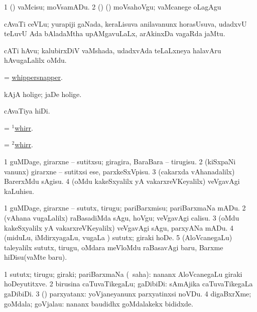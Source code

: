 \noindent
\gl{\akirx}
\expl{}
\bmng
\bnum
\num{1} (\AmA) vaMcisu; moVsamADu. 
\num{2} (\ame) (\ashi) moVsahoVgu; vaMcanege oLagAgu 
\enum
\emng
\eentry

\bentry 
{} 
\gl{\nA}
\expl{}
\bmng
cAvaTi ceVLu; yurapiji gaNada, keraLisuva anilavanunx horasUsuva, udadxvU teLuvU Ada bAladaMtha upAMgavuLaLx, arAkinxDa vagaRda jaMtu. 
\emng
\eentry

\bentry
{} 
\gl{\nA}
\expl{}
\bmng
cATi hAvu; kalubirxDiV vaMshada, udadxvAda teLaLxneya halavAru hAvugaLalilx oMdu. 
\emng
\eentry

\bentry
{} 
\gl{\nA}
\expl{}
\bmng
= \hyperlink{whippersnapper}{whippersnapper}. 
\emng
\eentry

\bentry
{} 
\gl{\nA}
\expl{}
\bmng
kAjA holige; jaDe holige. 
\emng
\eentry

\bentry
{} 
\gl{\nA}
\expl{}
\bmng
cAvaTiya hiDi. 
\emng
\eentry

\bentry
{} 
\gl{\akirx}
\expl{}
\bmng
= \hyperlink{whirr(1)}{$^1$whirr}. 
\emng
\eentry

\bentry
{} 
\gl{\nA}
\expl{}
\bmng
= \hyperlink{whirr(2)}{$^2$whirr}. 
\emng
\eentry

\bentry
{} 
\gl{\sakirx}
\expl{}
\bmng
\bnum
\num{1} guMDage, girarxne -- sutitxsu; giragira, BaraBara -- tirugisu. 
\num{2} (kiSxpaNi \mo vanunx) girarxne -- sutitxsi ese, parxkeSxVpisu. 
\num{3} (cakarxda vAhanadalilx) BarerxMdu sAgisu. 
\num{4} (oMdu kakeSxyalilx yA vakarxreVKeyalilx) veVgavAgi kaLuhisu. 
\enum
\emng

\noindent 
\gl{\akirx}
\expl{}
\bmng
\bnum
\num{1} guMDage, girarxne -- sututx, tirugu; pariBarxmisu; pariBarxmaNa mADu. 
\num{2} (vAhana \mo vugaLalilx) raBasadiMda sAgu, hoVgu; veVgavAgi calisu. 
\num{3} (oMdu kakeSxyalilx yA vakarxreVKeyalilx) veVgavAgi sAgu, parxyANa mADu. 
\num{4} (miduLu, iMdirxyagaLu, \mo vugaLa \vi) sututx; giraki hoDe. 
\num{5} (AloVcanegaLu) taleyalilx sututx, tirugu, oMdara meVloMdu raBasavAgi baru, Barxme hiDisu(vaMte baru). 
\enum
\emng
\eentry

\bentry
{} 
\gl{\nA}
\expl{}
\bmng
\bnum
\num{1} sututx; tirugu; giraki; pariBarxmaNa (\rUpa\ saha):  nananx AloVcanegaLu giraki hoDeyutitxve. 
\num{2} birusina caTuvaTikegaLu; gaDibiDi:  sAmAjika caTuvaTikegaLa gaDibiDi. 
\num{3} (\ashi) parxyatanx:  yoVjaneyanunx parxyatinxsi noVDu. 
\num{4} digaBxrXme; goMdala; goVjalau:  nananx baudidhx goMdalakekx bididxde. 
\enum
\emng
\eentry

